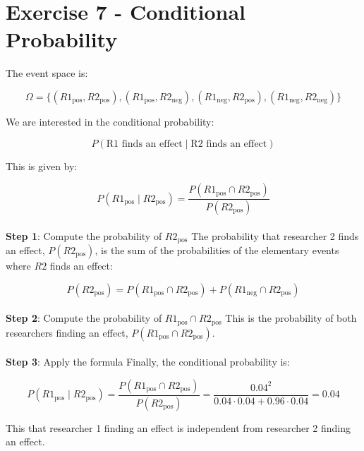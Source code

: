\documentclass{article}
\begin{document}
\section*{Exercise 7 - Conditional Probability}

The event space is:

\[
\Omega = \{ (R1_{\text{pos}}, R2_{\text{pos}}), (R1_{\text{pos}}, R2_{\text{neg}}), (R1_{\text{neg}}, R2_{\text{pos}}), (R1_{\text{neg}}, R2_{\text{neg}}) \}
\]

We are interested in the conditional probability:

\[
P(\text{R1 finds an effect} \mid \text{R2 finds an effect})
\]

This is given by:

\[
P(R1_{\text{pos}} \mid R2_{\text{pos}}) = \frac{P(R1_{\text{pos}} \cap R2_{\text{pos}})}{P(R2_{\text{pos}})}
\]
\\
\textbf{Step 1}: Compute the probability of \( R2_{\text{pos}} \)
The probability that researcher 2 finds an effect, \( P(R2_{\text{pos}}) \), is the sum of the probabilities of the elementary events where \( R2 \) finds an effect:

\[
P(R2_{\text{pos}}) = P(R1_{\text{pos}} \cap R2_{\text{pos}}) + P(R1_{\text{neg}} \cap R2_{\text{pos}})
\]
\\
\textbf{Step 2}: Compute the probability of \( R1_{\text{pos}} \cap R2_{\text{pos}} \)
This is the probability of both researchers finding an effect, \( P(R1_{\text{pos}} \cap R2_{\text{pos}}) \).\\
\\
\textbf{Step 3}: Apply the formula
Finally, the conditional probability is:

\[
P(R1_{\text{pos}} \mid R2_{\text{pos}}) = \frac{P(R1_{\text{pos}} \cap R2_{\text{pos}})}{P(R2_{\text{pos}})} = \frac{0.04^2}{0.04 \cdot 0.04 + 0.96 \cdot 0.04} = 0.04
\]

This that researcher 1 finding an effect is independent from researcher 2 finding an effect.
\end{document}
